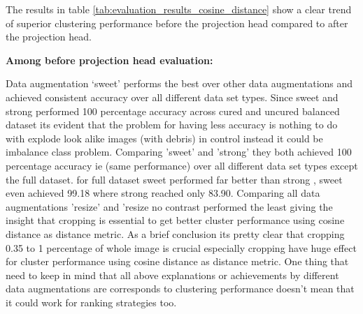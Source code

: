 The results in table \ref{tab:evaluation_results_cosine_distance} show a clear trend of superior clustering performance before the projection head compared to after the projection head.

\textbf{Among before projection head evaluation:} 

Data augmentation ‘sweet’ performs the best over other data augmentations and achieved consistent accuracy over all different data set types. Since sweet and strong performed 100 percentage accuracy across cured and uncured balanced dataset its evident that the problem for having less accuracy is nothing to do with explode look alike images (with debris)  in control instead it could be imbalance class problem. Comparing 'sweet' and 'strong' they both achieved 100 percentage accuracy ie (same performance) over all different data set types except the full dataset.
for full dataset sweet performed far better than strong , sweet even achieved 99.18 where strong reached only 83.90. Comparing all data augmentations 'resize' and 'resize no contrast performed the least giving the insight that cropping is essential to get better cluster performance using cosine distance as distance metric. As a brief conclusion its pretty clear that cropping 0.35 to 1 percentage of whole image is crucial especially cropping have huge effect for cluster performance using cosine distance as distance metric. One thing that need to keep in mind that all above explanations or achievements by different data augmentations are corresponds to clustering performance doesn't mean that it could work for ranking strategies too.



    

